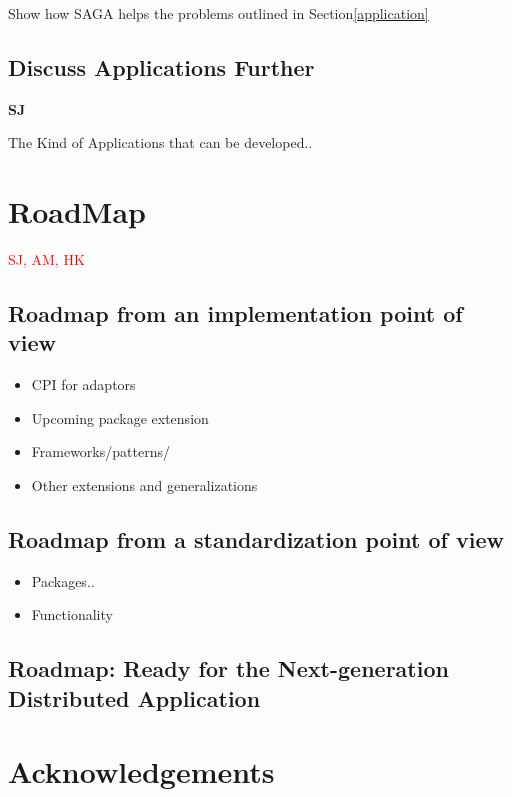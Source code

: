 \documentclass[10pt,letterpaper]{article}
\newcommand{\note}[1]{ {\textcolor{red}    { #1 }}}
\newcommand{\note}[1]{}
\begin{document}
Show how SAGA helps the problems outlined in Section\ref{application}

\subsection{Discuss Applications Further} {\bf SJ}
 
The Kind of Applications that can be developed..

\section{RoadMap} \note{SJ, AM, HK}

\subsection*{Roadmap from an implementation point of view}
\begin{itemize}
\item CPI for adaptors
\item Upcoming package extension
\item Frameworks/patterns/
\item Other extensions and generalizations
\end{itemize}

\subsection*{Roadmap from a standardization point of view}

\begin{itemize}
\item Packages.. 
\item Functionality
\end{itemize}

\subsection*{Roadmap: Ready for the Next-generation Distributed Application}

\section*{Acknowledgements}


%


\end{document}
